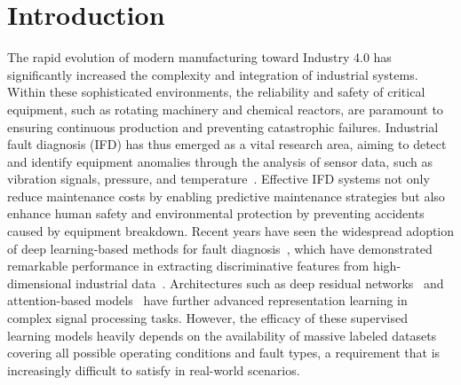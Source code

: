 \section{Introduction}
\label{sec:intro}

The rapid evolution of modern manufacturing toward Industry 4.0 has significantly increased the complexity and integration of industrial systems. Within these sophisticated environments, the reliability and safety of critical equipment, such as rotating machinery and chemical reactors, are paramount to ensuring continuous production and preventing catastrophic failures. Industrial fault diagnosis (IFD) has thus emerged as a vital research area, aiming to detect and identify equipment anomalies through the analysis of sensor data, such as vibration signals, pressure, and temperature~\cite{lei2020applications,feng2021fault,wen2017new}. Effective IFD systems not only reduce maintenance costs by enabling predictive maintenance strategies but also enhance human safety and environmental protection by preventing accidents caused by equipment breakdown. Recent years have seen the widespread adoption of deep learning-based methods for fault diagnosis~\cite{lecun2015deep,zhao2019deep,zhao2022deep,li2020deep,wu2021deep}, which have demonstrated remarkable performance in extracting discriminative features from high-dimensional industrial data~\cite{jing2017hierarchical,he2016deep,shao2017highly}. Architectures such as deep residual networks~\cite{he2016deep} and attention-based models~\cite{vaswani2017attention} have further advanced representation learning in complex signal processing tasks. However, the efficacy of these supervised learning models heavily depends on the availability of massive labeled datasets covering all possible operating conditions and fault types, a requirement that is increasingly difficult to satisfy in real-world scenarios.

